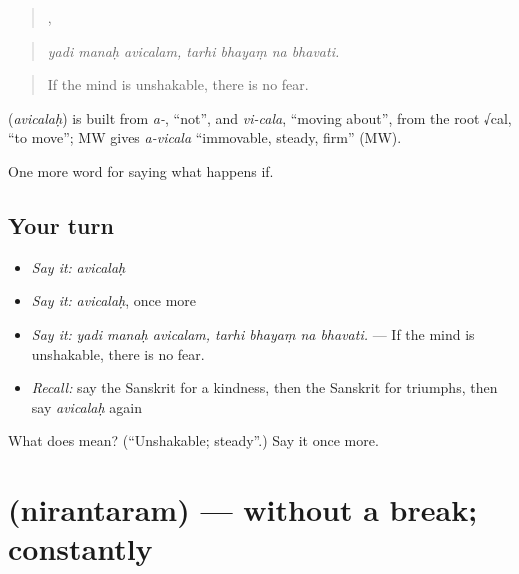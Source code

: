 \begin{quote}
  ,    
\end{quote}

\begin{quote}
\emph{yadi manaḥ avicalam, tarhi bhayaṃ na bhavati.}
\end{quote}

\begin{quote}
If the mind is unshakable, there is no fear.
\end{quote}

\begin{cousinweb}
\textbf{} (\emph{avicalaḥ}) is built from \emph{a-}, \textquotedblleft{}not\textquotedblright{}, and \emph{vi-cala}, \textquotedblleft{}moving about\textquotedblright{}, from the root √cal, \textquotedblleft{}to move\textquotedblright{}; MW gives \emph{a-vicala} \textquotedblleft{}immovable, steady, firm\textquotedblright{} (MW).
\end{cousinweb}

\begin{grammarlens}[title={What you've built}]
One more word for saying what happens if.
\end{grammarlens}

\subsection*{Your turn}
\begin{itemize}
\raggedright
  \item \emph{Say it:} \emph{avicalaḥ}
  \item \emph{Say it:} \emph{avicalaḥ}, once more
  \item \emph{Say it:} \emph{yadi manaḥ avicalam, tarhi bhayaṃ na bhavati.} — If the mind is unshakable, there is no fear.
  \item \emph{Recall:} say the Sanskrit for a kindness, then the Sanskrit for triumphs, then say \emph{avicalaḥ} again
\end{itemize}

\begin{tcolorbox}[breakable,colback=teal!4,colframe=teal!35!black,title={Before you move on}]
What does  mean? (\textquotedblleft{}Unshakable; steady\textquotedblright{}.) Say it once more.
\end{tcolorbox}
\section[\texorpdfstring{\sk{निरन्तरम्} (nirantaram)}{निरन्तरम् (nirantaram)}]{ (nirantaram) — without a break; constantly}


